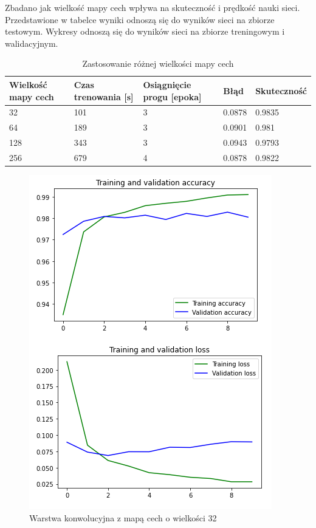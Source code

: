 \documentclass{article}
\begin{document}
Zbadano jak wielkość mapy cech wpływa na skuteczność i prędkość nauki sieci.
Przedstawione w tabelce wyniki odnoszą się do wyników sieci na zbiorze testowym. Wykresy odnoszą się do wyników sieci na zbiorze treningowym i walidacyjnym.

\begin{table}[h]
  \centering
    
  \bgroup
  \def\arraystretch{1.3}
\begin{tabular}{|l|l|l|l|l|}
\hline
Wielkość mapy cech & Czas trenowania [s] & Osiągnięcie progu [epoka] & Błąd & Skuteczność \\ \hline
32 & 101 & 3 & 0.0878 & 0.9835 \\ \hline
64 & 189 & 3 & 0.0901 & 0.981 \\ \hline
128 & 343 & 3 & 0.0943 & 0.9793 \\ \hline
256 & 679 & 4 & 0.0878 & 0.9822 \\ \hline
\end{tabular}
  \egroup
  \vspace{10pt}
  \caption{Zastosowanie różnej wielkości mapy cech}
\end{table}

\begin{figure}[!htb]
  \centering
  \includegraphics[width=\linewidth]{feature_32.png}
  \caption{Warstwa konwolucyjna z mapą cech o wielkości 32}
\end{figure}
\end{document}
